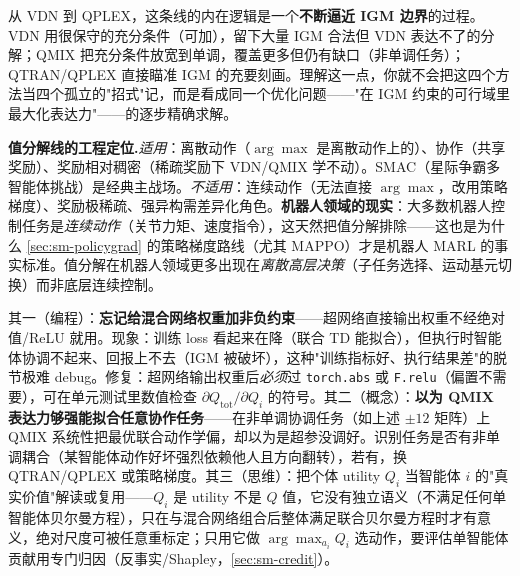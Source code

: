 \begin{insight}
从 VDN 到 QPLEX，这条线的内在逻辑是一个\textbf{不断逼近 IGM 边界}的过程。VDN 用很保守的充分条件（可加），留下大量 IGM 合法但 VDN 表达不了的分解；QMIX 把充分条件放宽到单调，覆盖更多但仍有缺口（非单调任务）；QTRAN/QPLEX 直接瞄准 IGM 的充要刻画。理解这一点，你就不会把这四个方法当四个孤立的"招式"记，而是看成同一个优化问题——"在 IGM 约束的可行域里最大化表达力"——的逐步精确求解。
\end{insight}

\begin{note}
\textbf{值分解线的工程定位.}\;\emph{适用}：离散动作（$\arg\max$ 是离散动作上的）、协作（共享奖励）、奖励相对稠密（稀疏奖励下 VDN/QMIX 学不动）。SMAC（星际争霸多智能体挑战）是经典主战场。\emph{不适用}：连续动作（无法直接 $\arg\max$，改用策略梯度）、奖励极稀疏、强异构需差异化角色。\textbf{机器人领域的现实}：大多数机器人控制任务是\emph{连续动作}（关节力矩、速度指令），这天然把值分解排除——这也是为什么 \cref{sec:sm-policygrad} 的策略梯度路线（尤其 MAPPO）才是机器人 MARL 的事实标准。值分解在机器人领域更多出现在\emph{离散高层决策}（子任务选择、运动基元切换）而非底层连续控制。
\end{note}

\begin{pitfall}
其一（编程）：\textbf{忘记给混合网络权重加非负约束}——超网络直接输出权重不经绝对值/ReLU 就用。现象：训练 loss 看起来在降（联合 TD 能拟合），但执行时智能体协调不起来、回报上不去（IGM 被破坏），这种"训练指标好、执行结果差"的脱节极难 debug。修复：超网络输出权重后\emph{必须}过 \texttt{torch.abs} 或 \texttt{F.relu}（偏置不需要），可在单元测试里数值检查 $\partial Q_{\text{tot}}/\partial Q_i$ 的符号。其二（概念）：\textbf{以为 QMIX 表达力够强能拟合任意协作任务}——在非单调协调任务（如上述 $\pm12$ 矩阵）上 QMIX 系统性把最优联合动作学偏，却以为是超参没调好。识别任务是否有非单调耦合（某智能体动作好坏强烈依赖他人且方向翻转），若有，换 QTRAN/QPLEX 或策略梯度。其三（思维）：把个体 utility $Q_i$ 当智能体 $i$ 的"真实价值"解读或复用——$Q_i$ 是 utility 不是 $Q$ 值，它没有独立语义（不满足任何单智能体贝尔曼方程），只在与混合网络组合后整体满足联合贝尔曼方程时才有意义，绝对尺度可被任意重标定；只用它做 $\arg\max_{a_i}Q_i$ 选动作，要评估单智能体贡献用专门归因（反事实/Shapley，\cref{sec:sm-credit}）。
\end{pitfall}

